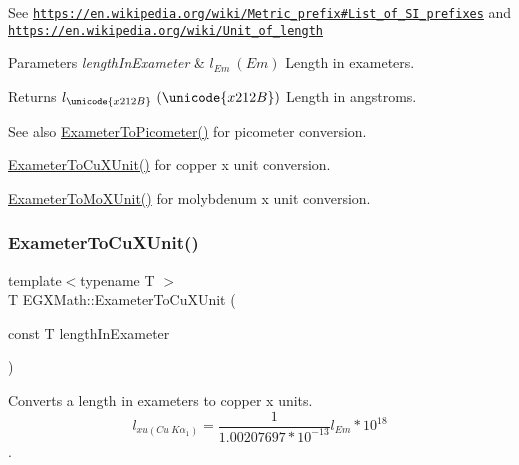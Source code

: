 See \href{https://en.wikipedia.org/wiki/Metric_prefix#List_of_SI_prefixes}{\tt https\+://en.\+wikipedia.\+org/wiki/\+Metric\+\_\+prefix\#\+List\+\_\+of\+\_\+\+S\+I\+\_\+prefixes} and \href{https://en.wikipedia.org/wiki/Unit_of_length}{\tt https\+://en.\+wikipedia.\+org/wiki/\+Unit\+\_\+of\+\_\+length} 
\begin{DoxyParams}{Parameters}
{\em length\+In\+Exameter} & $ l_{Em}\ (Em)$ Length in exameters. \\
\hline
\end{DoxyParams}
\begin{DoxyReturn}{Returns}
$ l_{\unicode{x212B}}\ (\unicode{x212B})$ Length in angstroms. 
\end{DoxyReturn}
\begin{DoxySeeAlso}{See also}
\mbox{\hyperlink{group___e_g_x_math-_conversions-_length_conversions-_exameter-_s_i_gaf524e8324fedf2eb61d43ce1dc36bcac}{Exameter\+To\+Picometer()}} for picometer conversion. 

\mbox{\hyperlink{group___e_g_x_math-_conversions-_length_conversions-_exameter-_non-_s_i_gacb2c9fea6b2c2d12ee485f378f5a6af0}{Exameter\+To\+Cu\+X\+Unit()}} for copper x unit conversion. 

\mbox{\hyperlink{group___e_g_x_math-_conversions-_length_conversions-_exameter-_non-_s_i_gadf73e46609660df6b7ae77ec7241183e}{Exameter\+To\+Mo\+X\+Unit()}} for molybdenum x unit conversion. 
\end{DoxySeeAlso}
\mbox{\label{group___e_g_x_math-_conversions-_length_conversions-_exameter-_non-_s_i_gacb2c9fea6b2c2d12ee485f378f5a6af0}} 
\subsubsection{\texorpdfstring{Exameter\+To\+Cu\+X\+Unit()}{ExameterToCuXUnit()}}
{\footnotesize\ttfamily template$<$typename T $>$ \\
T E\+G\+X\+Math\+::\+Exameter\+To\+Cu\+X\+Unit (\begin{DoxyParamCaption}\item[{const T}]{length\+In\+Exameter }\end{DoxyParamCaption})}



Converts a length in exameters to copper x units. \[ l_{xu(Cu\ K\alpha_1)}= \frac{1}{1.00207697*10^{-13}} l_{Em} * 10^{18}\]. 


